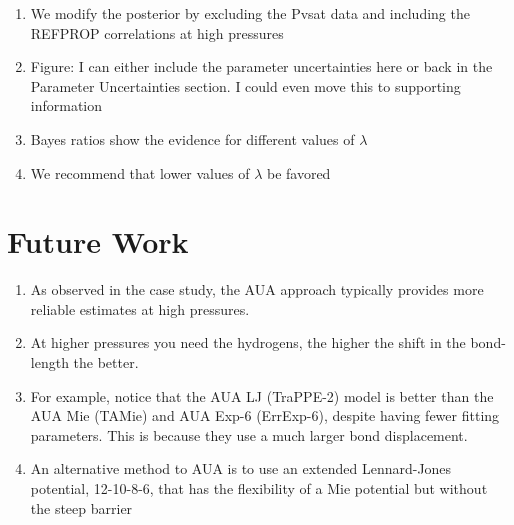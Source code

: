 \documentclass[preprint,letterpaper,floatfix,citeautoscript,aip,jcp]{revtex4-1}
\begin{document}
\begin{enumerate}
	\item We modify the posterior by excluding the Pvsat data and including the REFPROP correlations at high pressures
	\item Figure: I can either include the parameter uncertainties here or back in the Parameter Uncertainties section. I could even move this to supporting information
	\item Bayes ratios show the evidence for different values of $\lambda$
	\item We recommend that lower values of $\lambda$ be favored
\end{enumerate}

\section{Future Work}
\begin{enumerate}
	\item As observed in the case study, the AUA approach typically provides more reliable estimates at high pressures.
	\item At higher pressures you need the hydrogens, the higher the shift in the bond-length the better.
	\item For example, notice that the AUA LJ (TraPPE-2) model is better than the AUA Mie (TAMie) and AUA Exp-6 (ErrExp-6), despite having fewer fitting parameters. This is because they use a much larger bond displacement.
	\item An alternative method to AUA is to use an extended Lennard-Jones potential, 12-10-8-6, that has the flexibility of a Mie potential but without the steep barrier
\end{enumerate}
 
\end{document}
